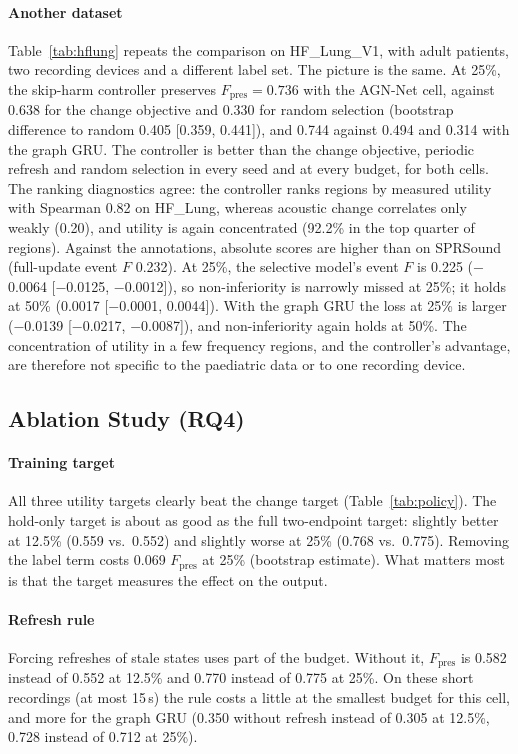 \paragraph*{Another dataset}
\label{sec:hflung}
Table~\ref{tab:hflung} repeats the comparison on HF\_Lung\_V1, with adult patients, two recording devices and a different label set. The picture is the same. At 25\%, the skip-harm controller preserves $F_{\mathrm{pres}}=0.736$ with the AGN-Net cell, against 0.638 for the change objective and 0.330 for random selection (bootstrap difference to random 0.405 [0.359, 0.441]), and 0.744 against 0.494 and 0.314 with the graph GRU. The controller is better than the change objective, periodic refresh and random selection in every seed and at every budget, for both cells. The ranking diagnostics agree: the controller ranks regions by measured utility with Spearman 0.82 on HF\_Lung, whereas acoustic change correlates only weakly (0.20), and utility is again concentrated (92.2\% in the top quarter of regions). Against the annotations, absolute scores are higher than on SPRSound (full-update event $F$ 0.232). At 25\%, the selective model's event $F$ is 0.225 (\ensuremath{-}0.0064 [\ensuremath{-}0.0125, \ensuremath{-}0.0012]), so non-inferiority is narrowly missed at 25\%; it holds at 50\% (0.0017 [\ensuremath{-}0.0001, 0.0044]). With the graph GRU the loss at 25\% is larger (\ensuremath{-}0.0139 [\ensuremath{-}0.0217, \ensuremath{-}0.0087]), and non-inferiority again holds at 50\%. The concentration of utility in a few frequency regions, and the controller's advantage, are therefore not specific to the paediatric data or to one recording device.

\hfltable

\subsection{Ablation Study (RQ4)}
\paragraph*{Training target} All three utility targets clearly beat the change target (Table~\ref{tab:policy}). The hold-only target is about as good as the full two-endpoint target: slightly better at 12.5\% (0.559 vs.\ 0.552) and slightly worse at 25\% (0.768 vs.\ 0.775). Removing the label term costs 0.069 $F_{\mathrm{pres}}$ at 25\% (bootstrap estimate). What matters most is that the target measures the effect on the output.

\paragraph*{Refresh rule} Forcing refreshes of stale states uses part of the budget. Without it, $F_{\mathrm{pres}}$ is 0.582 instead of 0.552 at 12.5\% and 0.770 instead of 0.775 at 25\%. On these short recordings (at most 15\,s) the rule costs a little at the smallest budget for this cell, and more for the graph GRU (0.350 without refresh instead of 0.305 at 12.5\%, 0.728 instead of 0.712 at 25\%).

